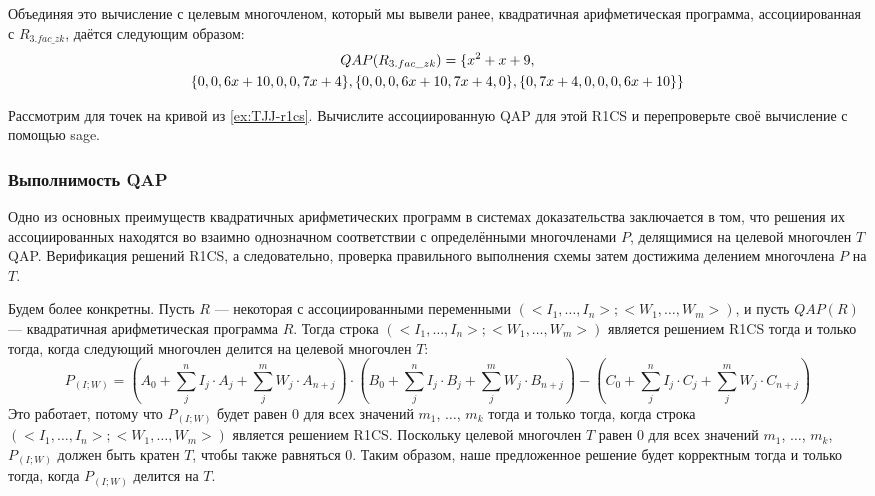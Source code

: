 \begin{example}[3-factorization]
Объединяя это вычисление с целевым многочленом, который мы вывели ранее, квадратичная арифметическая программа, ассоциированная с  $R_{3.fac\_zk}$, даётся следующим образом:
\begin{multline}
\label{QAP-R3-fac-zk}
QAP(R_{3.fac\_zk}) =\{x^{2}+x+9,\notag\\
 \{0,0,6x+10,0,0,7x+4\},\{0,0,0,6x+10,7x+4,0\},\{0,7x+4,0,0,0,6x+10\}\}
\end{multline}
\end{example}
\begin{exercise}
Рассмотрим  для точек на кривой  из \examplename{} \ref{ex:TJJ-r1cs}. Вычислите ассоциированную QAP для этой R1CS и перепроверьте своё вычисление с помощью sage.
\end{exercise}
\subsubsection{Выполнимость QAP} Одно из основных преимуществ квадратичных арифметических программ в системах доказательства заключается в том, что решения их ассоциированных  находятся во взаимно однозначном соответствии с определёнными многочленами $P$, делящимися на целевой многочлен $T$ QAP. Верификация решений R1CS, а следовательно, проверка правильного выполнения схемы затем достижима делением многочлена $P$ на $T$.

Будем более конкретны. Пусть $R$ — некоторая  с ассоциированными переменными $(<I_1,\ldots,I_n>; <W_1,\ldots, W_m>)$, и пусть $QAP(R)$ — квадратичная арифметическая программа $R$. Тогда строка $(<I_1,\ldots,I_n>; <W_1,\ldots, W_m>)$ является решением R1CS тогда и только тогда, когда следующий многочлен делится на целевой многочлен $T$:
\begin{equation}\label{polynomial-P-IW}
P_{(I;W)} = \scriptstyle \left(A_0 + \sum_{j}^n I_j\cdot A_j + \sum_{j}^m W_j\cdot A_{n+j} \right) \cdot \left(B_0 + \sum_{j}^n I_j\cdot B_j + \sum_{j}^m W_j\cdot B_{n+j} \right) 
-\left(C_0 + \sum_{j}^n I_j\cdot C_j + \sum_{j}^m W_j\cdot C_{n+j} \right)
\end{equation}
Это работает, потому что $P_{(I;W)}$ будет равен $0$ для всех значений $m_1$, $\ldots$, $m_k$ тогда и только тогда, когда строка $(<I_1,\ldots,I_n>; <W_1,\ldots, W_m>)$ является решением R1CS. Поскольку целевой многочлен $T$ равен $0$ для всех значений $m_1$, $\ldots$, $m_k$, $P_{(I;W)}$ должен быть кратен $T$, чтобы также равняться $0$. Таким образом, наше предложенное решение будет корректным тогда и только тогда, когда $P_{(I;W)}$ делится на $T$.

